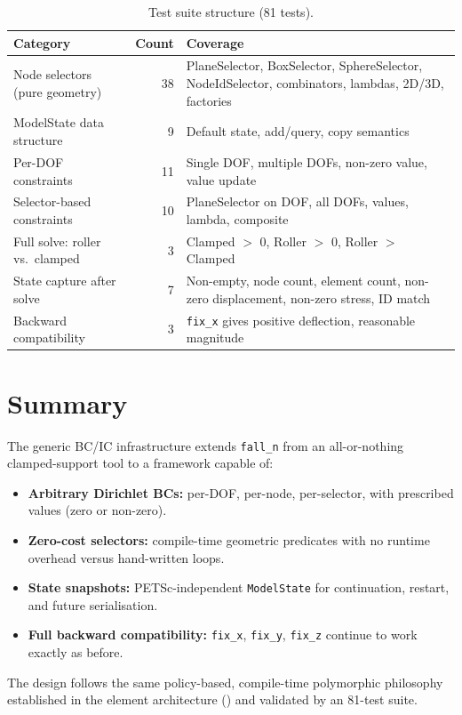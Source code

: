 \begin{table}[ht]
\centering\small
\caption{Test suite structure (81 tests).}
\label{tab:bc-tests}
\begin{tabular}{lrl}
\toprule
\textbf{Category} & \textbf{Count} & \textbf{Coverage} \\
\midrule
Node selectors (pure geometry) & 38 &
  PlaneSelector, BoxSelector, SphereSelector, NodeIdSelector,
  combinators, lambdas, 2D/3D, factories \\
ModelState data structure & 9 &
  Default state, add/query, copy semantics \\
Per-DOF constraints & 11 &
  Single DOF, multiple DOFs, non-zero value, value update \\
Selector-based constraints & 10 &
  PlaneSelector on DOF, all DOFs, values, lambda, composite \\
Full solve: roller vs.\ clamped & 3 &
  Clamped $>$ 0, Roller $>$ 0, Roller $>$ Clamped \\
State capture after solve & 7 &
  Non-empty, node count, element count, non-zero
  displacement, non-zero stress, ID match \\
Backward compatibility & 3 &
  \texttt{fix\_x} gives positive deflection, reasonable magnitude \\
\bottomrule
\end{tabular}
\end{table}


\section{Summary}
\label{sec:bc-summary}

The generic BC/IC infrastructure extends \texttt{fall\_n} from an
all-or-nothing clamped-support tool to a framework capable of:

\begin{itemize}[nosep]
  \item \textbf{Arbitrary Dirichlet BCs:}  per-DOF, per-node, per-selector,
        with prescribed values (zero or non-zero).
  \item \textbf{Zero-cost selectors:}  compile-time geometric predicates
        with no runtime overhead versus hand-written loops.
  \item \textbf{State snapshots:}  PETSc-independent \texttt{ModelState}
        for continuation, restart, and future serialisation.
  \item \textbf{Full backward compatibility:}  \texttt{fix\_x}, \texttt{fix\_y},
        \texttt{fix\_z} continue to work exactly as before.
\end{itemize}

\noindent
The design follows the same policy-based, compile-time polymorphic
philosophy established in the element architecture ()
and validated by an 81-test suite.
